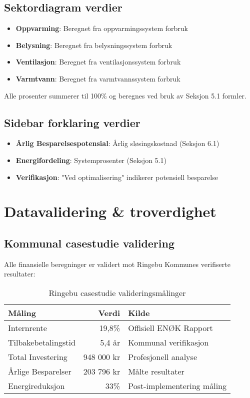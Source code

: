 \documentclass[12pt,a4paper]{article}
\begin{document}
\subsection{Sektordiagram verdier}

\begin{itemize}
\item \textbf{Oppvarming}: Beregnet fra oppvarmingssystem forbruk
\item \textbf{Belysning}: Beregnet fra belysningssystem forbruk
\item \textbf{Ventilasjon}: Beregnet fra ventilasjonssystem forbruk
\item \textbf{Varmtvann}: Beregnet fra varmtvannssystem forbruk
\end{itemize}

Alle prosenter summerer til 100\% og beregnes ved bruk av Seksjon 5.1 formler.

\subsection{Sidebar forklaring verdier}

\begin{itemize}
\item \textbf{Årlig Besparelsespotensial}: Årlig sløsingskostnad (Seksjon 6.1)
\item \textbf{Energifordeling}: Systemprosenter (Seksjon 5.1)
\item \textbf{Verifikasjon}: "Ved optimalisering" indikerer potensiell besparelse
\end{itemize}

\section{Datavalidering \& troverdighet}

\subsection{Kommunal casestudie validering}

Alle finansielle beregninger er validert mot Ringebu Kommunes verifiserte resultater:

\begin{table}[H]
\centering
\begin{tabular}{|l|r|l|}
\hline
\textbf{Måling} & \textbf{Verdi} & \textbf{Kilde} \\
\hline
Internrente & 19,8\% & Offisiell ENØK Rapport \\
Tilbakebetalingstid & 5,4 år & Kommunal verifikasjon \\
Total Investering & 948 000 kr & Profesjonell analyse \\
Årlige Besparelser & 203 796 kr & Målte resultater \\
Energireduksjon & 33\% & Post-implementering måling \\
\hline
\end{tabular}
\caption{Ringebu casestudie valideringsmålinger}
\end{table}
\end{document}
